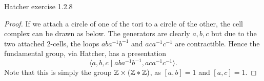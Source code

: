 \documentclass{../../mathnotes}
\begin{document}
\begin{prop}
    Hatcher exercise 1.2.8
\end{prop}
\begin{proof}
    If we attach a circle of one of the tori to a circle of the other, the cell complex can
    be drawn as below. The generators are clearly $a,b,c$ but due to the two attached 2-cells,
    the loops $aba^{-1}b^{-1}$ and $aca^{-1}c^{-1}$ are contractible. Hence the fundamental
    group, via Hatcher, has a presentation
    \[\langle a,b,c\mid aba^{-1}b^{-1}, aca^{-1}c^{-1}\rangle.\]
    Note that this is simply the group $\mathbb{Z}\times (\mathbb{Z}*\mathbb{Z})$, as $[a,b]=1$ and $[a,c]=1$.  
\end{proof}
\end{document}
